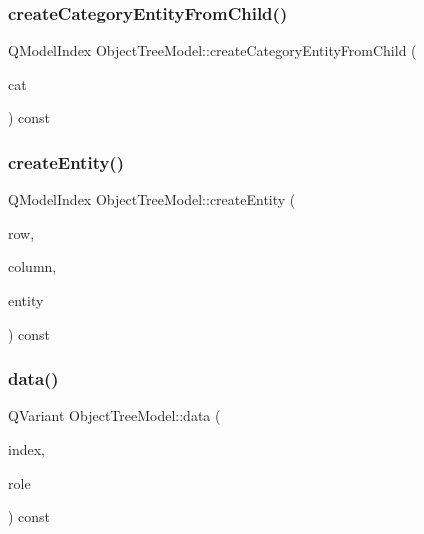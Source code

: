 \mbox{\label{class_object_tree_model_a140e6152d9bca924d7a6b7af20f8e864}} 
\subsubsection{\texorpdfstring{createCategoryEntityFromChild()}{createCategoryEntityFromChild()}}
{\footnotesize\ttfamily Q\+Model\+Index Object\+Tree\+Model\+::create\+Category\+Entity\+From\+Child (\begin{DoxyParamCaption}\item[{\mbox{\hyperlink{class_object_tree_model_a379e9d6b0d381853785adf62095ba4e3}{Object\+Tree\+Model\+::\+Category}}}]{cat }\end{DoxyParamCaption}) const}

\mbox{\label{class_object_tree_model_a4a61094a1e0e7fd4036e27cfcd286f4c}} 
\subsubsection{\texorpdfstring{createEntity()}{createEntity()}}
{\footnotesize\ttfamily Q\+Model\+Index Object\+Tree\+Model\+::create\+Entity (\begin{DoxyParamCaption}\item[{int}]{row,  }\item[{int}]{column,  }\item[{\mbox{\hyperlink{classobjecttree_1_1_object_tree_entity}{objecttree\+::\+Object\+Tree\+Entity}} $\ast$}]{entity }\end{DoxyParamCaption}) const}

\mbox{\label{class_object_tree_model_a927caf32b34220593af63cb3e0c77094}} 
\subsubsection{\texorpdfstring{data()}{data()}}
{\footnotesize\ttfamily Q\+Variant Object\+Tree\+Model\+::data (\begin{DoxyParamCaption}\item[{const Q\+Model\+Index \&}]{index,  }\item[{int}]{role }\end{DoxyParamCaption}) const}

